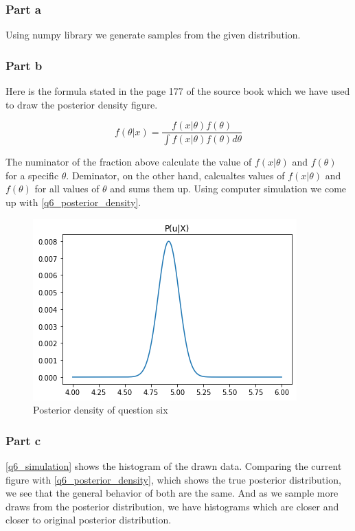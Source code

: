 \documentclass[12pt, a4paper]{book}
\begin{document}
\subsubsection*{Part a}

Using numpy library we generate samples from the given distribution.

\subsubsection*{Part b}

Here is the formula stated in the page 177 of the source book
which we have used to draw the posterior density figure.

$$f(\theta|x) = \frac{f(x|\theta) f(\theta)}{\int f(x|\theta) f(\theta) d\theta}$$

The numinator of the fraction above calculate the value of $f(x|\theta)$ and $f(\theta)$ for a
specific $\theta$. Deminator, on the other hand, calcualtes values of $f(x|\theta)$ and $f(\theta)$
for all values of $\theta$ and sums them up. Using computer simulation we come up with \autoref{q6_posterior_density}.

\begin{figure}[h]
    \centering
    \includegraphics[width=0.5\linewidth]{image/q6/posterior.png}
    \caption{Posterior density of question six}
    \label{q6_posterior_density}
\end{figure}

\subsubsection*{Part c}

\autoref{q6_simulation} shows the histogram of the drawn data.
Comparing the current figure with \autoref{q6_posterior_density}, which shows the true posterior distribution,
we see that the general behavior of both are the same. And as we sample more draws from the posterior distribution,
we have histograms which are closer and closer to original posterior distribution.
\end{document}
